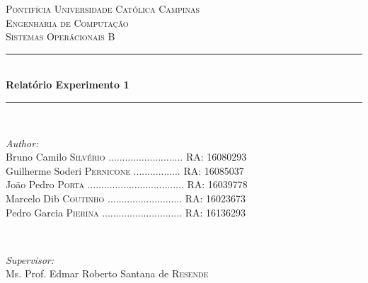 \begin{titlepage}

\newcommand{\HRule}{\rule{\linewidth}{0.5mm}} %

\center %
 

\textsc{\LARGE Pontifícia Universidade Católica Campinas}\\[1.0cm] %
\textsc{\Large Engenharia de Computação}\\[0.5cm] %
\textsc{\large Sistemas Operácionais B}\\[0.5cm] %


\HRule \\[0.4cm]
{ \huge \bfseries Relatório Experimento 1}\\[0.4cm] %
\HRule \\[1.5cm]
 

\begin{flushleft} \large
\emph{Author:}\\
Bruno Camilo \textsc{Silvério} ........................... RA: 16080293\\
Guilherme Soderi \textsc{Pernicone}   ................. RA: 16085037\\
João Pedro \textsc{Porta}      ................................... RA: 16039778\\
Marcelo Dib \textsc{Coutinho}  ........................... RA: 16023673\\
Pedro Garcia \textsc{Pierina} ............................. RA: 16136293\\
\end{flushleft}
~
\begin{center} \large
\emph{Supervisor:} \\
Ms. Prof. Edmar Roberto Santana de \textsc{Resende}\\[1cm] %
\end{center}


\end{titlepage}
